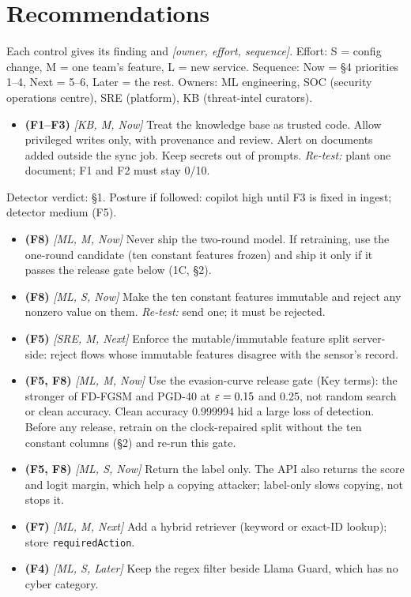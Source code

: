 \section{Recommendations}

Each control gives its finding and \emph{[owner, effort, sequence]}. Effort: S = config change, M = one team's feature, L = new service. Sequence: Now = \S4 priorities 1--4, Next = 5--6, Later = the rest. Owners: ML engineering, SOC (security operations centre), SRE (platform), KB (threat-intel curators).

\begin{itemize}
\item \textbf{(F1--F3)} \emph{[KB, M, Now]} Treat the knowledge base as trusted code. Allow privileged writes only, with provenance and review. Alert on documents added outside the sync job. Keep secrets out of prompts. \emph{Re-test:} plant one document; F1 and F2 must stay 0/10.
\end{itemize}

 Detector verdict: \S1. Posture if followed: copilot high until F3 is fixed in ingest; detector medium (F5).
\begin{itemize}
\item \textbf{(F8)} \emph{[ML, M, Now]} Never ship the two-round model. If retraining, use the one-round candidate (ten constant features frozen) and ship it only if it passes the release gate below (1C, \S2).
\item \textbf{(F8)} \emph{[ML, S, Now]} Make the ten constant features immutable and reject any nonzero value on them. \emph{Re-test:} send one; it must be rejected.
\item \textbf{(F5)} \emph{[SRE, M, Next]} Enforce the mutable/immutable feature split server-side: reject flows whose immutable features disagree with the sensor's record.
\item \textbf{(F5, F8)} \emph{[ML, M, Now]} Use the evasion-curve release gate (Key terms): the stronger of FD-FGSM and PGD-40 at $\varepsilon=0.15$ and 0.25, not random search or clean accuracy. Clean accuracy 0.999994 hid a large loss of detection. Before any release, retrain on the clock-repaired split without the ten constant columns (\S2) and re-run this gate.
\item \textbf{(F5, F8)} \emph{[ML, S, Now]} Return the label only. The API also returns the score and logit margin, which help a copying attacker; label-only slows copying, not stops it.
\item \textbf{(F7)} \emph{[ML, M, Next]} Add a hybrid retriever (keyword or exact-ID lookup); store \texttt{requiredAction}.
\item \textbf{(F4)} \emph{[ML, S, Later]} Keep the regex filter beside Llama Guard, which has no cyber category.
\end{itemize}

